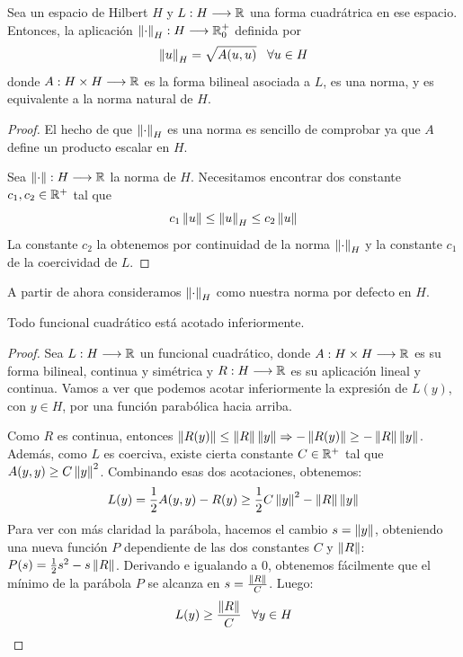 \begin{prop}
Sea un espacio de Hilbert $H$ y $L : H \longrightarrow \mathbb{R}$ una forma cuadrátrica en ese espacio.
Entonces, la aplicación $\left\lVert\cdot\right\rVert_H : H \longrightarrow \mathbb{R}^+_0$ definida por 
\[
\left\lVert u\right\rVert_H=\sqrt{A(u,u)} \;\;\; \forall u\in H
\]
donde $A : H\times H \longrightarrow \mathbb{R}$ es la forma bilineal asociada a $L$, es una norma, y es equivalente a la norma natural de $H$.
\end{prop}
\begin{proof}
El hecho de que $\left\lVert\cdot\right\rVert_H$ es una norma es sencillo de comprobar ya que $A$ define un producto escalar en $H$.

Sea $\left\lVert\cdot\right\rVert : H \longrightarrow \mathbb{R}$ la norma de $H$. Necesitamos encontrar dos constante $c_1,c_2\in\mathbb{R}^+$ tal que 
\[
c_1\left\lVert u\right\rVert\leq \left\lVert u\right\rVert_H \leq c_2\left\lVert u\right\rVert
\]
La constante $c_2$ la obtenemos por continuidad de la norma $\left\lVert\cdot\right\rVert_H$ y la constante $c_1$ de la coercividad de $L$.

\end{proof}

A partir de ahora consideramos $\left\lVert\cdot\right\rVert_H$ como nuestra norma por defecto en $H$.

\begin{prop}
Todo funcional cuadrático está acotado inferiormente.
\end{prop}
\begin{proof}
Sea $L : H \longrightarrow \mathbb{R}$ un funcional cuadrático, donde $A : H\times H \longrightarrow \mathbb{R}$ es su forma bilineal, continua y simétrica y $R : H \longrightarrow \mathbb{R}$ es su aplicación lineal y continua.
Vamos a ver que podemos acotar inferiormente la expresión de $L(y)$, con $y\in H$, por una función parabólica hacia arriba.

Como $R$ es continua, entonces $\left\lVert R(y)\right\rVert\leq \left\lVert R\right\rVert\left\lVert y\right\rVert \Rightarrow -\left\lVert R(y)\right\rVert \geq -\left\lVert R\right\rVert\left\lVert y\right\rVert$. Además, como $L$ es coerciva, existe cierta constante $C\in\mathbb{R}^+$ tal que $A(y,y)\geq C\left\lVert y\right\rVert^2$. Combinando esas dos acotaciones, obtenemos:
\[
L(y)=\frac{1}{2}A(y,y)-R(y)\geq \frac{1}{2}C\left\lVert y\right\rVert^2-\left\lVert R\right\rVert\left\lVert y\right\rVert
\]
Para ver con más claridad la parábola, hacemos el cambio $s=\left\lVert y\right\rVert$, obteniendo una nueva función $P$ dependiente de las dos constantes $C$ y $\left\lVert R\right\rVert$: $P(s)=\frac{1}{2}s^2-s\left\lVert R\right\rVert$. Derivando e igualando a 0, obtenemos fácilmente que el mínimo de la parábola $P$ se alcanza en $s=\frac{\left\lVert R\right\rVert}{C}$. Luego:
\[
L(y)\geq \frac{\left\lVert R\right\rVert}{C} \;\;\; \forall y\in H 
\]

\end{proof}

